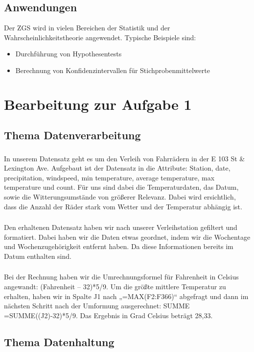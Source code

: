 \documentclass{article}
\begin{document}
\subsection{Anwendungen}
Der ZGS wird in vielen Bereichen der Statistik und der Wahrscheinlichkeitstheorie angewendet. Typische Beispiele sind:
\begin{itemize}
    \item Durchführung von Hypothesentests
    \item Berechnung von Konfidenzintervallen für Stichprobenmittelwerte
\end{itemize}
\newpage
\section{Bearbeitung zur Aufgabe 1}
\subsection{Thema Datenverarbeitung}
\subsubsection{}In unserem Datensatz geht es um den Verleih von Fahrrädern in der E 103 St \&
Lexington Ave. Aufgebaut ist der Datensatz in die Attribute: Station, date,
precipitation, windspeed, min temperature, average temperature,
max temperature und count. Für uns sind dabei die Temperaturdaten, das Datum, sowie die Witterungsumstände von größerer Relevanz. Dabei wird
ersichtlich, dass die Anzahl der Räder stark vom Wetter und der Temperatur
abhängig ist.
\subsubsection{}Den erhaltenen Datensatz haben wir nach unserer Verleihstation gefiltert und
formatiert. Dabei haben wir die Daten etwas geordnet, indem wir die Wochentage
und Wochenzugehörigkeit entfernt haben. Da diese Informationen bereits im Datum enthalten sind.
\subsubsection{}Bei der Rechnung haben wir die Umrechnungsformel für Fahrenheit in Celsius
angewandt: (Fahrenheit – 32)*5/9. Um die größte mittlere Temperatur zu erhalten,
haben wir in Spalte J1 nach „=MAX(F2:F366)“ abgefragt und dann im nächsten Schritt
nach der Umformung ausgerechnet: SUMME =SUMME((J2)-32)*5/9. Das Ergebnis in
Grad Celsius beträgt 28,33.
\subsection{Thema Datenhaltung}
\end{document}
